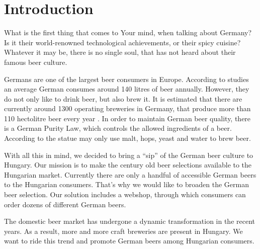 

\newcommand\Title{Group Assignment}
\newcommand\Date{\today}
\newcommand\Name{Ádám Kohajda \\ Dániel Nagy \\ József Szenka \\ László Kocsis \\ Zoltán Hafner}
\newcommand\Course{Marketing}
\newcommand\Neptun{BMEGT20MW01}
\newcommand\CourseNeptun{BMEGT20MW01}






\section{Introduction}
What is the first thing that comes to Your mind, when talking about Germany? Is it their world-renowned technological achievements, or their spicy cuisine? Whatever it may be, there is no single soul, that has not heard about their famous beer culture.

Germans are one of the largest beer consumers in Europe. According to studies an average German consumes around 140 litres of beer annually. However, they do not only like to drink beer, but also brew it. It is estimated that there are currently around 1300 operating breweries in Germany, that produce more than 110 hectolitre beer every year \cite{statista1}. In order to maintain German beer quality, there is a German Purity Law, which controls the allowed ingredients of a beer. According to the statue may only use malt, hops, yeast and water to brew beer.

With all this in mind, we decided to bring a “sip” of the German beer culture to Hungary. Our mission is to make the century old beer selections available to the Hungarian market. Currently there are only a handful of accessible German beers to the Hungarian consumers. That’s why we would like to broaden the German beer selection. Our solution includes a webshop, through which consumers can order dozens of different German beers.

The domestic beer market has undergone a dynamic transformation in the recent years. As a result, more and more craft breweries are present in Hungary. We want to ride this trend and promote German beers among Hungarian consumers.

